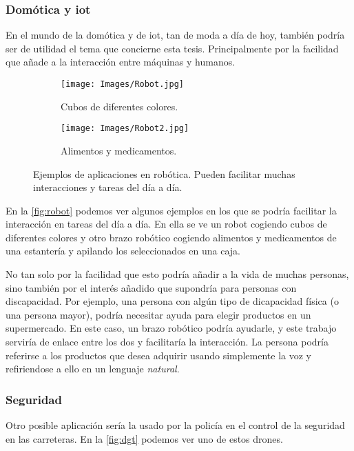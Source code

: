 \subsubsection{Domótica y \acs*{iot}}
En el mundo de la domótica y de \gls{iot}, tan de moda a día de hoy, también
podría ser de utilidad el tema que concierne esta tesis. Principalmente por la
facilidad que añade a la interacción entre máquinas y humanos.

\begin{figure}[ht]
  \centering
  \begin{subfigure}[t]{.55\textwidth}
    \centering
    \caption{Cubos de diferentes colores.}
    \texttt{[image: Images/Robot.jpg]}
  \end{subfigure}\hfill
  \begin{subfigure}[t]{.4\textwidth}
    \centering
    \caption{Alimentos y medicamentos.}
    \texttt{[image: Images/Robot2.jpg]}
  \end{subfigure}
  \caption[Ejemplos de aplicaciones en robótica]{Ejemplos de aplicaciones en
    robótica. Pueden facilitar muchas interacciones y tareas del día a día.}
  \label{fig:robot}
\end{figure}

En la \vref{fig:robot} podemos ver algunos ejemplos en los que se podría
facilitar la interacción en tareas del día a día. En ella se ve un robot
cogiendo cubos de diferentes colores y otro brazo robótico cogiendo alimentos y
medicamentos de una estantería y apilando los seleccionados en una caja.

No tan solo por la facilidad que esto podría añadir a la vida de muchas
personas, sino también por el interés añadido que supondría para personas con
discapacidad. Por ejemplo, una persona con algún tipo de dicapacidad física (o
una persona mayor), podría necesitar ayuda para elegir productos en un
supermercado. En este caso, un brazo robótico podría ayudarle, y este trabajo
serviría de enlace entre los dos y facilitaría la interacción. La persona
podría referirse a los productos que desea adquirir usando simplemente la voz y
refiriendose a ello en un lenguaje \emph{natural}.

\subsubsection{Seguridad}
Otro posible aplicación sería la usado por la policía en el control de la
seguridad en las carreteras. En la \vref{fig:dgt} podemos ver uno de estos
drones.

